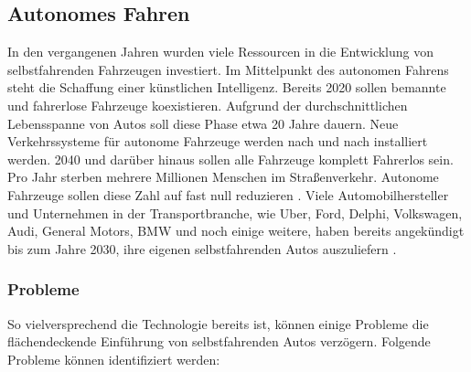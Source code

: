 \documentclass{sigchi}
\begin{document}
\subsection{Autonomes Fahren}
In den vergangenen Jahren wurden viele Ressourcen in die Entwicklung von selbstfahrenden Fahrzeugen investiert. Im Mittelpunkt des autonomen Fahrens steht die Schaffung einer künstlichen Intelligenz. Bereits 2020 sollen bemannte und fahrerlose Fahrzeuge koexistieren. Aufgrund der durchschnittlichen Lebensspanne von Autos soll diese Phase etwa 20 Jahre dauern. Neue Verkehrssysteme für autonome Fahrzeuge werden nach und nach installiert werden. 2040 und darüber hinaus sollen alle Fahrzeuge komplett Fahrerlos sein. Pro Jahr sterben mehrere Millionen Menschen im Straßenverkehr. Autonome Fahrzeuge sollen diese Zahl auf fast null reduzieren \cite{drive-my-car:2017}. Viele Automobilhersteller und Unternehmen in der Transportbranche, wie Uber, Ford, Delphi, Volkswagen, Audi, General Motors, BMW und noch einige weitere, haben bereits angekündigt bis zum Jahre 2030, ihre eigenen selbstfahrenden Autos auszuliefern \cite{driverless-future:2016}.

\subsubsection{Probleme}
So vielversprechend die Technologie bereits ist, können einige Probleme die flächendeckende Einführung von selbstfahrenden Autos verzögern. Folgende Probleme können identifiziert werden:
\end{document}
